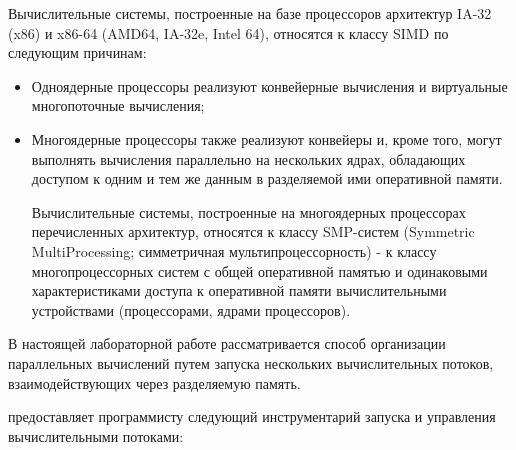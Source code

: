 Вычислительные системы, построенные на базе процессоров архитектур IA-32 (x86) и x86-64 (AMD64, IA-32e, Intel 64), относятся к классу SIMD по следующим причинам:

\begin{itemize}

	\item Одноядерные процессоры реализуют конвейерные вычисления и виртуальные многопоточные вычисления;
	\item Многоядерные процессоры также реализуют конвейеры и, кроме того, могут выполнять вычисления параллельно на нескольких ядрах, обладающих доступом к одним и тем же данным в разделяемой ими оперативной памяти.

	Вычислительные системы, построенные на многоядерных процессорах перечисленных архитектур, относятся к классу SMP-систем (Symmetric MultiProcessing; симметричная мультипроцессорность) - к классу многопроцессорных систем с общей оперативной памятью и одинаковыми характеристиками доступа к оперативной памяти вычислительными устройствами (процессорами, ядрами процессоров).

\end{itemize}

В настоящей лабораторной работе рассматривается способ организации параллельных вычислений путем запуска нескольких вычислительных потоков, взаимодействующих через разделяемую память.


\gl предоставляет программисту следующий инструментарий запуска и управления вычислительными потоками:


